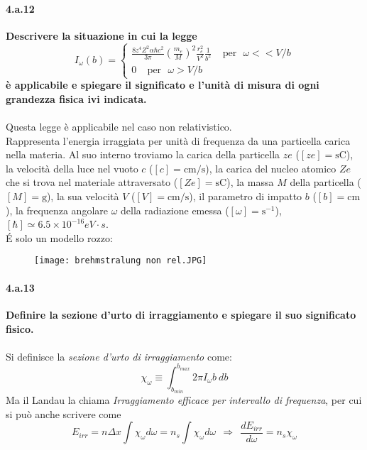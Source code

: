 \documentclass[twoside]{article}
\begin{document}
\paragraph{4.a.12}\textbf{Descrivere la situazione in cui la legge
\begin{equation}
    I_{\omega}(b)=\left\{ \begin{array}{lr}
         \frac{8z^4 Z^2 \alpha \hbar c^2}{3\pi}\left( \frac{m_e}{M} \right)^2 \frac{r_e^2}{V^2}\frac{1}{b^2} \ \ \ \ \ \text{per} \ \ \ \omega << V/b \\
         0 \ \ \ \ \ \text{per} \ \ \ \omega > V/b
    \end{array}\right.
\end{equation}
è
applicabile e spiegare il significato e l'unità di misura di ogni grandezza fisica ivi
indicata.
}\\ \\
Questa legge è applicabile nel caso non relativistico.
\\
Rappresenta l'energia irraggiata per unità di frequenza da una particella carica nella materia. Al suo interno troviamo la carica della particella $ze$ ($[ze]=\text{sC}$), la velocità della luce nel vuoto $c$ ($[c]=\text{cm/s}$), la carica del nucleo atomico $Ze$ che si trova nel materiale attraversato ($[Ze]=\text{sC}$), la massa $M$ della particella ($[M]=\text{g}$), la sua velocità $V$ ($[V]=\text{cm/s}$), il parametro di impatto $b$ ($[b]=\text{cm}$), la frequenza angolare $\omega$ della radiazione emessa ($[\omega]=\text{s}^{-1}$), $[\hbar]\simeq 6.5 \times 10^{-16} eV\cdot s$. 
\\
\'E solo un modello rozzo:
  \begin{figure}[H]
    \begin{center}
    \texttt{[image: brehmstralung non rel.JPG]}
    \end{center}
    \label{brem}
    \end{figure}

\paragraph{4.a.13}\textbf{Definire la sezione d'urto di irraggiamento e spiegare il suo significato fisico.}\\ \\
Si definisce la \textit{sezione d'urto di irraggiamento} come:
\begin{equation}
    \chi_{\omega}\equiv \int_{b_{min}}^{b_{max}}2\pi I_{\omega}b\ db
\end{equation}
Ma il Landau la chiama \textit{Irraggiamento efficace per intervallo di frequenza}, per cui si può anche scrivere come
\begin{equation}
    E_{irr}=n\Delta x \int \chi_\omega d\omega =n_s \int \chi_\omega d\omega \ \ \Rightarrow \ \ \frac{dE_{irr}}{d\omega}=n_s\chi_\omega
\end{equation}
\end{document}
